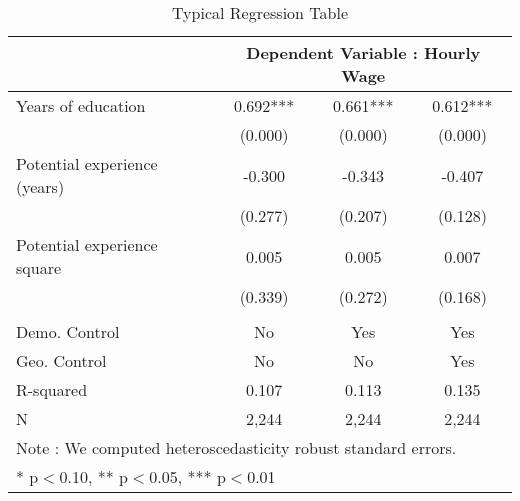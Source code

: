 \begin{table}[htbp]
\centering
\caption{Typical Regression Table}
\label{table.regtable}
\begin{tabular}{l*{3}{c}}
\hline
\hline
 & \multicolumn{3}{c}{Dependent Variable : Hourly Wage}\\
\hline
Years of education&       0.692***&       0.661***&       0.612***\\
            &     (0.000)   &     (0.000)   &     (0.000)   \\
Potential experience (years)&      -0.300   &      -0.343   &      -0.407   \\
            &     (0.277)   &     (0.207)   &     (0.128)   \\
Potential experience square&       0.005   &       0.005   &       0.007   \\
            &     (0.339)   &     (0.272)   &     (0.168)   \\
\\
\hline
Demo. Control&          No   &         Yes   &         Yes   \\
Geo. Control&          No   &          No   &         Yes   \\
R-squared   &       0.107   &       0.113   &       0.135   \\
N           &       2,244   &       2,244   &       2,244   \\
\hline\hline
\multicolumn{4}{l}{Note : We computed heteroscedasticity robust standard errors.} \\
\multicolumn{4}{l}{* p$<$0.10, ** p$<$0.05, *** p$<$0.01}\\
\end{tabular}
\end{table}
